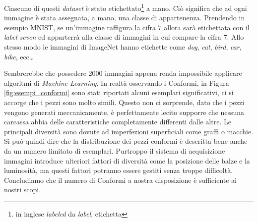 Ciascuno di questi \textit{dataset} è stato etichettato\footnote{in inglese \textit{labeled} da \textit{label}, etichetta} a mano.
Ciò significa che ad ogni immagine è stata assegnata, a mano, una classe di appartenenza.
Prendendo in esempio MNIST, se un'immagine raffigura la cifra $7$ allora sarà etichettata con il \textit{label seven} ed apparterrà alla classe di immagini in cui compare la cifra $7$.
Allo stesso modo le immagini di ImageNet hanno etichette come \textit{dog}, \textit{cat}, \textit{bird}, \textit{car}, \textit{bike}, ecc\dots %

Sembrerebbe che possedere 2000 immagini appena renda impossibile applicare algoritmi di \textit{Machine Learning}.
In realtà osservando i Conformi, in Figura \ref{fig:esempi_conformi} sono stati riportati alcuni esemplari significativi, ci si accorge che i pezzi sono molto simili.
Questo non ci sorprende, dato che i pezzi vengono generati meccanicamente, è perfettamente lecito supporre che nessuna carcassa abbia delle caratteristiche completamente differenti dalle altre.
Le principali diversità sono dovute ad imperfezioni superficiali come graffi o macchie.
Si può quindi dire che la distribuzione dei pezzi conformi è descritta bene anche da un numero limitato di esemplari.
Purtroppo il sistema di acquisizione immagini introduce ulteriori fattori di diversità come la posizione delle balze e la luminosità, ma questi fattori potranno essere gestiti senza troppe difficoltà.
Concludiamo che il numero di Conformi a nostra disposizione è sufficiente ai nostri scopi.


